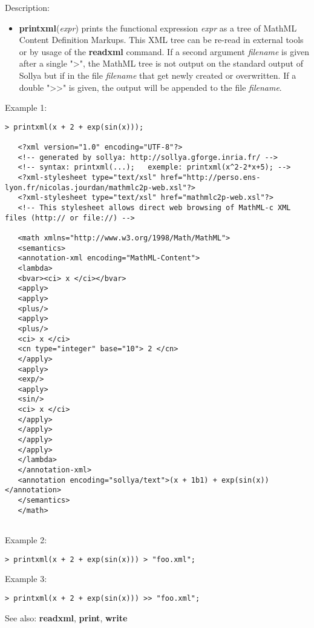 \noindent Description: \begin{itemize}

\item \textbf{printxml}(\emph{expr}) prints the functional expression \emph{expr} as a tree of
   MathML Content Definition Markups. This XML tree can be re-read in
   external tools or by usage of the \textbf{readxml} command.
   If a second argument \emph{filename} is given after a single ">", the
   MathML tree is not output on the standard output of Sollya but if in
   the file \emph{filename} that get newly created or overwritten. If a double
   ">>" is given, the output will be appended to the file \emph{filename}.
\end{itemize}
\noindent Example 1: 
\begin{center}\begin{minipage}{14.8cm}\begin{Verbatim}[frame=single]
   > printxml(x + 2 + exp(sin(x)));
   
   <?xml version="1.0" encoding="UTF-8"?>
   <!-- generated by sollya: http://sollya.gforge.inria.fr/ -->
   <!-- syntax: printxml(...);   exemple: printxml(x^2-2*x+5); -->
   <?xml-stylesheet type="text/xsl" href="http://perso.ens-lyon.fr/nicolas.jourdan/mathmlc2p-web.xsl"?>
   <?xml-stylesheet type="text/xsl" href="mathmlc2p-web.xsl"?>
   <!-- This stylesheet allows direct web browsing of MathML-c XML files (http:// or file://) -->
   
   <math xmlns="http://www.w3.org/1998/Math/MathML">
   <semantics>
   <annotation-xml encoding="MathML-Content">
   <lambda>
   <bvar><ci> x </ci></bvar>
   <apply>
   <apply>
   <plus/>
   <apply>
   <plus/>
   <ci> x </ci>
   <cn type="integer" base="10"> 2 </cn>
   </apply>
   <apply>
   <exp/>
   <apply>
   <sin/>
   <ci> x </ci>
   </apply>
   </apply>
   </apply>
   </apply>
   </lambda>
   </annotation-xml>
   <annotation encoding="sollya/text">(x + 1b1) + exp(sin(x))</annotation>
   </semantics>
   </math>
   
\end{Verbatim}
\end{minipage}\end{center}
\noindent Example 2: 
\begin{center}\begin{minipage}{14.8cm}\begin{Verbatim}[frame=single]
   > printxml(x + 2 + exp(sin(x))) > "foo.xml";
\end{Verbatim}
\end{minipage}\end{center}
\noindent Example 3: 
\begin{center}\begin{minipage}{14.8cm}\begin{Verbatim}[frame=single]
   > printxml(x + 2 + exp(sin(x))) >> "foo.xml";
\end{Verbatim}
\end{minipage}\end{center}
See also: \textbf{readxml}, \textbf{print}, \textbf{write}
